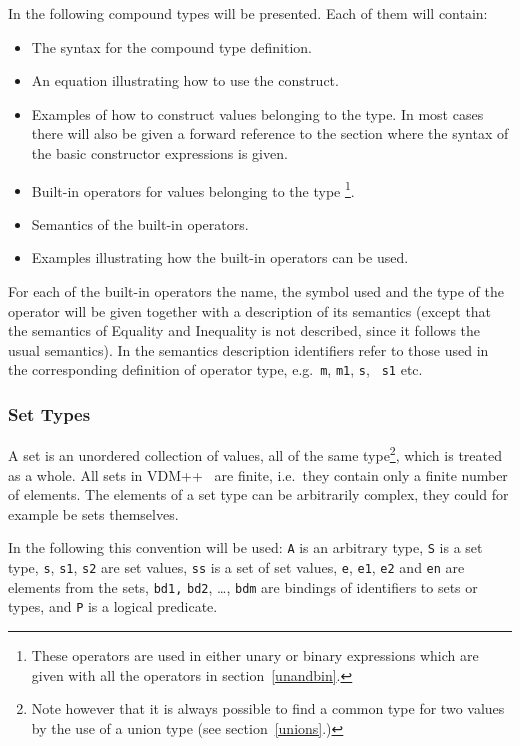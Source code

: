 \documentclass[\pformat,12pt]{article}
\newcommand{\vdmslpp}[2]{%
#2
}
\newcommand{\vdmsl}{VDM-SL}
\newcommand{\vdmpp}{VDM++}
\begin{document}
In the following compound types will be presented. Each of
them will contain:
\begin{itemize}
\item The syntax for the compound type definition.
\item An equation illustrating how to use the construct.
\item Examples of how to construct values belonging to the type. In
  most cases there will also be given a forward reference to the
  section where the syntax of the basic constructor expressions is given.
\item Built-in operators for values belonging to the
  type \footnote{These operators are used in either unary or binary
    expressions which are given with all the operators in
    section~\ref{unandbin}.}.
\item Semantics of the built-in operators.
\item Examples illustrating how the built-in operators can be used.
\end{itemize}
For each of the built-in operators the name, the symbol used and the
type of the operator will be given together with a description of its
semantics (except that the semantics of Equality and Inequality is not
described, since it follows the usual semantics). In the semantics
description identifiers refer to those used in the corresponding
definition of operator type, e.g.\ {\tt m}, {\tt m1}, {\tt s}, {\tt
  s1} etc.

\subsubsection{Set Types}
\label{sets}

A set is an unordered collection of values, all of the same
type\footnote{Note however that it is always possible to find a common
  type for two values by the use of a union type (see
  section~\ref{unions}.)}, which is treated as a whole. All sets in 
\vdmslpp{\vdmsl}{\vdmpp}\ are finite, i.e.\ they contain only a finite
number of elements. The elements of a set type can be arbitrarily
complex, they could for example be sets themselves.

In the following this convention will be used: {\tt A} is an arbitrary
type, {\tt S} is a set type, {\tt s}, {\tt s1}, {\tt s2} are set
values, {\tt ss} is a set of set values, {\tt e}, {\tt e1}, {\tt e2}
and {\tt en} are elements from the sets, {\tt bd1,} {\tt bd2}, \ldots,
{\tt bdm} are bindings of identifiers to sets or types, and {\tt P} is
a logical predicate.
\end{document}
